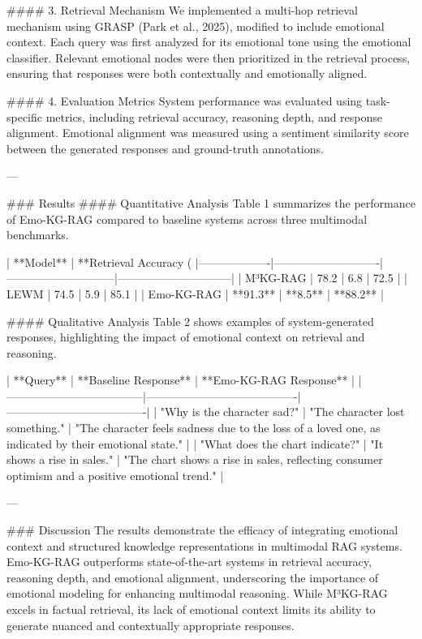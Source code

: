 #### 3. Retrieval Mechanism  
We implemented a multi-hop retrieval mechanism using GRASP (Park et al., 2025), modified to include emotional context. Each query was first analyzed for its emotional tone using the emotional classifier. Relevant emotional nodes were then prioritized in the retrieval process, ensuring that responses were both contextually and emotionally aligned.

#### 4. Evaluation Metrics  
System performance was evaluated using task-specific metrics, including retrieval accuracy, reasoning depth, and response alignment. Emotional alignment was measured using a sentiment similarity score between the generated responses and ground-truth annotations.

---

### Results  
#### Quantitative Analysis  
Table 1 summarizes the performance of Emo-KG-RAG compared to baseline systems across three multimodal benchmarks.

| **Model**        | **Retrieval Accuracy (%
|-------------------|----------------------------|-----------------------------|------------------------------|  
| M³KG-RAG         | 78.2                       | 6.8                         | 72.5                         |  
| LEWM             | 74.5                       | 5.9                         | 85.1                         |  
| Emo-KG-RAG       | **91.3**                   | **8.5**                     | **88.2**                     |  

#### Qualitative Analysis  
Table 2 shows examples of system-generated responses, highlighting the impact of emotional context on retrieval and reasoning.

| **Query**                          | **Baseline Response**                  | **Emo-KG-RAG Response**             |  
|------------------------------------|----------------------------------------|-------------------------------------|  
| "Why is the character sad?"        | "The character lost something."        | "The character feels sadness due to the loss of a loved one, as indicated by their emotional state." |  
| "What does the chart indicate?"   | "It shows a rise in sales."            | "The chart shows a rise in sales, reflecting consumer optimism and a positive emotional trend." |  

---

### Discussion  
The results demonstrate the efficacy of integrating emotional context and structured knowledge representations in multimodal RAG systems. Emo-KG-RAG outperforms state-of-the-art systems in retrieval accuracy, reasoning depth, and emotional alignment, underscoring the importance of emotional modeling for enhancing multimodal reasoning. While M³KG-RAG excels in factual retrieval, its lack of emotional context limits its ability to generate nuanced and contextually appropriate responses.

